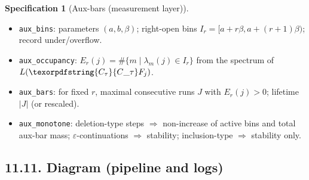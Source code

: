 \documentclass[11pt]{article}
\numberwithin{equation}{section}
\theoremstyle{plain}
\theoremstyle{definition}
\theoremstyle{remark}
\DeclareMathOperator{\Ext}{Ext}
\DeclareRobustCommand{\hyp}{\nobreakdash-}
\newcommand{\Rfun}{\mathcal{R}}
\theoremstyle{plain}
\theoremstyle{definition}
\numberwithin{equation}{section}
\theoremstyle{definition}
\newtheorem{specification}[theorem]{Specification}
\DeclareRobustCommand{\Ttau}{\texorpdfstring{\ensuremath{\mathbf{T}_{\tau}}}{T\_\tau}}
\DeclareRobustCommand{\Ctau}{\texorpdfstring{\ensuremath{C_{\tau}}}{C\_\tau}}
\DeclareRobustCommand{\muc}{\mu_{\mathrm{Collapse}}}
\DeclareRobustCommand{\nuc}{\nu_{\mathrm{Collapse}}}
\DeclareRobustCommand{\LC}{\texorpdfstring{\ensuremath{\mathrm{(LC)}}}{(LC)}}
\numberwithin{equation}{section}
\theoremstyle{plain}
\theoremstyle{definition}
\theoremstyle{remark}
\providecommand{\Cfun}[1]{\mathsf{C}_{#1}}
\providecommand{\Tfun}[1]{\mathbf{T}_{#1}}
\providecommand{\Ctau}{\Cfun{\tau}}
\providecommand{\Ttau}{\Tfun{\tau}}
\providecommand{\muc}{\mu_{\mathrm{Collapse}}}
\providecommand{\nuc}{\nu_{\mathrm{Collapse}}}
\providecommand{\n}{\unskip\space}
\begin{document}
\begin{specification}[Aux-bars (measurement layer)]
\begin{itemize}
  \item \texttt{aux\_bins}: parameters $(a,b,\beta)$; right-open bins $I_r=[a+r\beta,a+(r+1)\beta)$; record under/overflow.
  \item \texttt{aux\_occupancy}: $E_r(j)=\#\{m\mid \lambda_m(j)\in I_r\}$ from the spectrum of $L(\Ctau F_j)$.
  \item \texttt{aux\_bars}: for fixed $r$, maximal consecutive runs $J$ with $E_r(j)>0$; lifetime $|J|$ (or rescaled).
  \item \texttt{aux\_monotone}: deletion-type steps $\Rightarrow$ non\hyp increase of active bins and total aux-bar mass; $\varepsilon$-continuations $\Rightarrow$ stability; inclusion-type $\Rightarrow$ stability only.
\end{itemize}
\end{specification}

\subsection*{11.11. Diagram (pipeline and logs)}
\begin{center}
\end{center}
\end{document}
